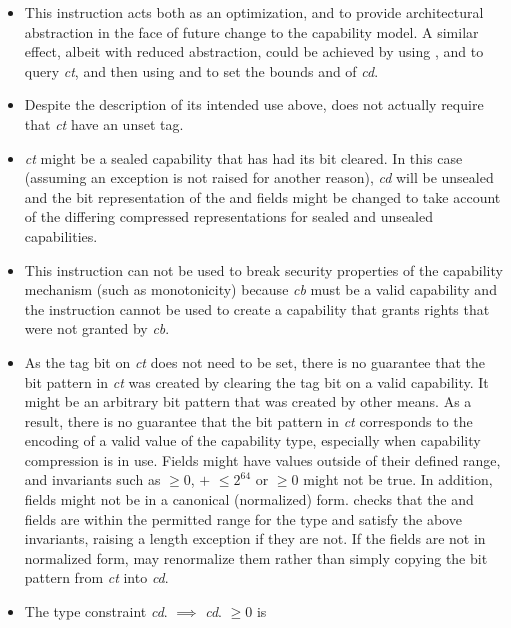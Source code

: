 \begin{itemize}
\item
This instruction acts both as an optimization, and to provide architectural
abstraction in the face of future change to the capability model.
A similar effect, albeit with reduced abstraction, could be achieved by
using ,  and
 to query \emph{ct}, and then using
 and  to set the bounds
and \cperms{} of \emph{cd}.
\item
Despite the description of its intended use above, 
does not actually require that \emph{ct} have an unset tag.
\item
\emph{ct} might be a sealed capability that has had its \ctag{} bit cleared.
In this case (assuming an exception is not raised for another reason),
\emph{cd} will be unsealed and the bit representation of
the \cbase{} and \clength{} fields might be changed to take account of
the differing compressed representations for sealed and unsealed capabilities.
\item
This instruction can not be used to break security properties of the capability
mechanism (such as monotonicity) because \emph{cb} must be a valid capability
and the instruction cannot be used to create a capability that grants rights
that were not granted by \emph{cb}.
\item
As the tag bit on \emph{ct} does not need to be set, there is no guarantee
that the bit pattern in \emph{ct} was created by clearing the tag bit on a
valid capability. It might be an arbitrary bit pattern that was created by
other means. As a result, there is no guarantee that the bit pattern in
\emph{ct} corresponds to the encoding of a valid value of the capability type,
especially when capability compression is in use. Fields might have values outside
of their defined range, and invariants such as \cbase{} $\ge 0$, \cbase{} $+$
\clength{} $\le 2^{64}$ or \clength{} $\ge 0$ might not be true. In addition,
fields might not be in a canonical (normalized) form.
 checks that the \cbase{} and \clength{} fields are
within the permitted range for the type and satisfy the above invariants,
raising a length exception if they are not. If the fields are not in normalized
form,  may renormalize them rather than simply
copying the bit pattern from \emph{ct} into \emph{cd}.
\item
The type constraint \emph{cd}.\ctag{} $\implies$ \emph{cd}.\cbase{} $\ge 0$ is

\end{itemize}

